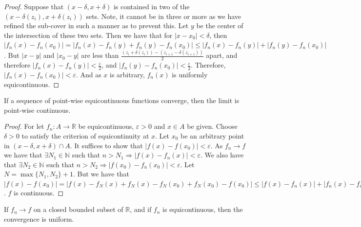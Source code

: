 \documentclass[crop=false,class=book,oneside]{standalone}
\begin{document}
\begin{proof}
                Suppose that $(x-\delta,x+\delta)$ is contained in two of
                the $(x-\delta(z_i),x+\delta(z_i))$ sets. Note, it cannot
                be in three or more as we have refined the sub-cover in
                such a manner as to prevent this. Let $y$ be the center
                of the intersection of these two sets. Then we have that
                for $|x-x_0|<\delta$, then
                $|f_n(x)-f_n(x_0)|%
                 =|f_n(x)-f_n(y)+f_n(y)-f_n(x_0)|%
                 \leq|f_n(x)-f_n(y)|+|f_n(y)-f_n(x_0)|$.
                But $|x-y|$ and $|x_0-y|$ are less than
                $\frac{(z_i + \delta(z_i))-(z_{i+1}-\delta(z_{i+1}))}{2}$
                apart, and therefore $|f_n(x)-f_n(y)|<\frac{\varepsilon}{2}$,
                and $|f_n(y)-f_n(x_0)|<\frac{\varepsilon}{2}$.
                Therefore, $|f_n(x)-f_n(x_0)|<\varepsilon$.
                And as $x$ is arbitrary,
                $f_n(x)$ is uniformly equicontinuous.
            \end{proof}
            \begin{theorem}
                If a sequence of point-wise equicontinuous functions converge, then the limit is point-wise continuous.
            \end{theorem}
            \begin{proof}
                For let $f_n:A\rightarrow \mathbb{R}$ be equicontinuous, $\varepsilon>0$ and $x\in A$ be given. Choose $\delta>0$ to satisfy the criterion of equicontinuity at $x$. Let $x_0$ be an arbitrary point in $(x-\delta,x+\delta)\cap A$. It suffices to show that $|f(x) - f(x_0)|<\varepsilon$. As $f_n \rightarrow f$ we have that $\exists N_1 \in\mathbb{N}$ such that $n>N_1\Rightarrow |f(x) - f_n(x)|<\varepsilon$. We also have that $\exists N_2 \in \mathbb{N}$ such that $n>N_2 \Rightarrow |f(x_0)-f_n(x_0)|<\varepsilon$. Let $N=\max\{N_1,N_2\}+1$. But we have that $|f(x) - f(x_0)| = |f(x) - f_N(x) + f_N(x)-f_N(x_0) + f_N(x_0) - f(x_0)|\leq |f(x) - f_n(x)| + |f_n(x)-f_n(x_0)| + |f_n(x_0) - f(x_0)| < 3\varepsilon$. $f$ is continuous.
            \end{proof}
            \begin{theorem}
                If $f_n \rightarrow f$ on a closed bounded subset of $\mathbb{R}$, and if $f_n$ is equicontinuous, then the convergence is uniform.
            \end{theorem}
\end{document}
